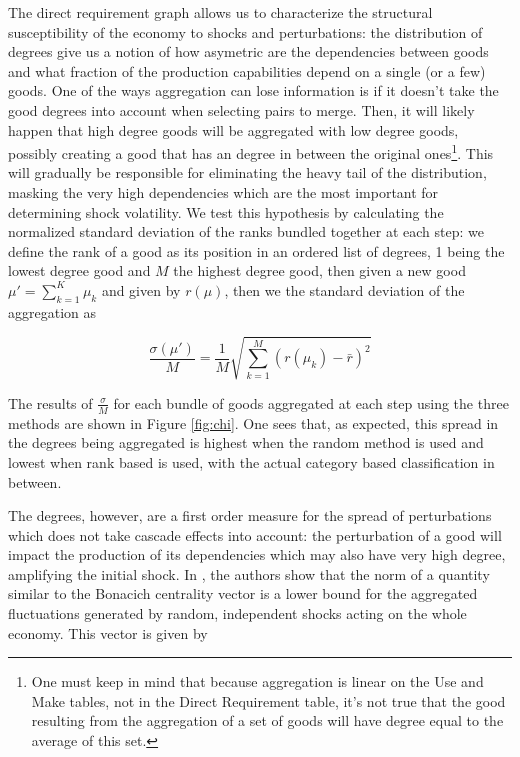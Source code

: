 The direct requirement graph allows us to characterize the structural
susceptibility of the economy to shocks and perturbations: the
distribution of degrees give us a notion of how asymetric are the
dependencies between goods and what fraction of the production
capabilities depend on a single (or a few) goods. One of the ways
aggregation can lose information is if it doesn't take the good
degrees into account when selecting pairs to merge. Then, it will
likely happen that high degree goods will be aggregated with low
degree goods, possibly creating a good that has an degree in between the original ones\footnote{One must keep in mind that because aggregation is linear on the Use and Make tables, not in the Direct Requirement table, it's not true that the good resulting from the aggregation of a set of goods will have degree equal to the average of this set.}. This will gradually be responsible for eliminating the heavy tail of the distribution, masking the very high dependencies which are the most important for determining shock volatility. We test this hypothesis by calculating the normalized standard deviation of the ranks bundled together at each step: we define the rank of a good as its position in an ordered list of degrees, 1 being the lowest degree good and $M$ the highest degree good, then given a new good $\mu' = \sum_{k=1}^K \mu_k$ and given by  $r(\mu)$, then we the standard deviation of the aggregation as

\begin{equation}
    \frac{\sigma(\mu')}{M} = \frac{1}{M} \sqrt{\sum_{k=1}^M \left(r(\mu_k) - \bar{r}\right)^2}
\end{equation}

The results of $\frac{\sigma}{M}$ for each bundle of goods aggregated at each step using the three methods are shown in Figure \ref{fig:chi}. One sees that, as expected, this spread in the degrees being aggregated is highest when the random method is used and lowest when rank based is used, with the actual category based classification in between.

The degrees, however, are a first order measure for the spread of
perturbations which does not take cascade effects into account: the
perturbation of a good will impact the production of its dependencies
which may also have very high degree, amplifying the initial shock. In
\cite{Acemoglu12}, the authors show that the norm of a quantity similar to
the Bonacich centrality vector \cite{JacksonBook} is a lower bound for
the aggregated fluctuations generated by random, independent shocks
acting on the whole economy. This vector is given by

